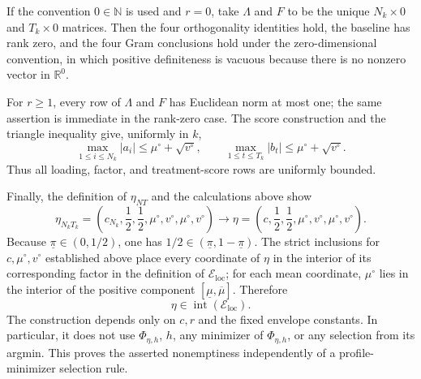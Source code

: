 If the convention \(0\in\mathbb N\) is used and \(r=0\), take \(\Lambda\) and \(F\) to be the unique \(N_k\times0\) and \(T_k\times0\) matrices. Then the four orthogonality identities hold, the baseline has rank zero, and the four Gram conclusions hold under the zero-dimensional convention, in which positive definiteness is vacuous because there is no nonzero vector in \(\mathbb R^0\).

For \(r\ge1\), every row of \(\Lambda\) and \(F\) has Euclidean norm at most one; the same assertion is immediate in the rank-zero case. The score construction and the triangle inequality give, uniformly in \(k\),
\[
 \max_{1\le i\le N_k}|a_i|
 \le\mu^\circ+\sqrt{v^\circ},
 \qquad
 \max_{1\le t\le T_k}|b_t|
 \le\mu^\circ+\sqrt{v^\circ}.
\]
Thus all loading, factor, and treatment-score rows are uniformly bounded.

Finally, the definition of \(\eta_{NT}\) and the calculations above show
\[
 \eta_{N_kT_k}
 =\left(c_{N_k},\frac12,\frac12,
         \mu^\circ,v^\circ,\mu^\circ,v^\circ\right)
 \longrightarrow
 \eta
 =\left(c,\frac12,\frac12,
         \mu^\circ,v^\circ,\mu^\circ,v^\circ\right).
\]
Because \(\underline\pi\in(0,1/2)\), one has \(1/2\in(\underline\pi,1-\underline\pi)\). The strict inclusions for \(c,\mu^\circ,v^\circ\) established above place every coordinate of \(\eta\) in the interior of its corresponding factor in the definition of \(\mathcal E_{\mathrm{loc}}\); for each mean coordinate, \(\mu^\circ\) lies in the interior of the positive component \([\underline\mu,\overline\mu]\). Therefore
\[
 \eta\in\operatorname{int}(\mathcal E_{\mathrm{loc}}).
\]
The construction depends only on \(c,r\) and the fixed envelope constants. In particular, it does not use \(\Phi_{\eta,h}\), \(h\), any minimizer of \(\Phi_{\eta,h}\), or any selection from its argmin. This proves the asserted nonemptiness independently of a profile-minimizer selection rule.
